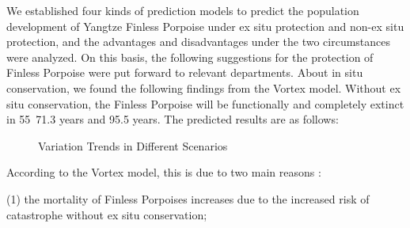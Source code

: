 \documentclass{mcmthesis}
\numberwithin{figure}{section}
\numberwithin{table}{section}
\numberwithin{equation}{section}
\begin{document}
\begin{memo}

  We established four kinds of prediction models to predict the 
  population development of Yangtze Finless Porpoise under ex 
  situ protection and non-ex situ protection, and the advantages 
  and disadvantages under the two circumstances were analyzed. 
  On this basis, the following suggestions for the protection of 
  Finless Porpoise were put forward to relevant departments.
  About in situ conservation, we found the following findings 
  from the Vortex model. Without ex situ conservation, 
  the Finless Porpoise will be functionally and completely 
  extinct in 55~71.3 years and 95.5 years. The predicted 
  results are as follows:
\begin{figure}[htbp]\label{ExtinctionPic}
    \centering
    \caption{Variation Trends in Different Scenarios}
  \end{figure}
  \par
  According to the Vortex model, this is due to two main reasons :
  \par(1) the mortality of Finless Porpoises increases due to the increased risk of catastrophe without ex situ conservation; 

\end{memo}
\end{document}
